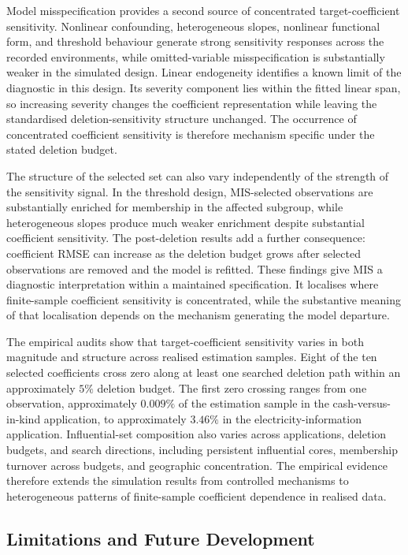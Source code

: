 \documentclass[../main.tex]{subfiles}
\begin{document}
Model misspecification provides a second source of concentrated target-coefficient sensitivity. Nonlinear confounding, heterogeneous slopes, nonlinear functional form, and threshold behaviour generate strong sensitivity responses across the recorded environments, while omitted-variable misspecification is substantially weaker in the simulated design. Linear endogeneity identifies a known limit of the diagnostic in this design. Its severity component lies within the fitted linear span, so increasing severity changes the coefficient representation while leaving the standardised deletion-sensitivity structure unchanged. The occurrence of concentrated coefficient sensitivity is therefore mechanism specific under the stated deletion budget.

The structure of the selected set can also vary independently of the strength of the sensitivity signal. In the threshold design, MIS-selected observations are substantially enriched for membership in the affected subgroup, while heterogeneous slopes produce much weaker enrichment despite substantial coefficient sensitivity. The post-deletion results add a further consequence: coefficient RMSE can increase as the deletion budget grows after selected observations are removed and the model is refitted. These findings give MIS a diagnostic interpretation within a maintained specification. It localises where finite-sample coefficient sensitivity is concentrated, while the substantive meaning of that localisation depends on the mechanism generating the model departure.

The empirical audits show that target-coefficient sensitivity varies in both magnitude and structure across realised estimation samples. Eight of the ten selected coefficients cross zero along at least one searched deletion path within an approximately \(5\%\) deletion budget. The first zero crossing ranges from one observation, approximately \(0.009\%\) of the estimation sample in the cash-versus-in-kind application, to approximately \(3.46\%\) in the electricity-information application. Influential-set composition also varies across applications, deletion budgets, and search directions, including persistent influential cores, membership turnover across budgets, and geographic concentration. The empirical evidence therefore extends the simulation results from controlled mechanisms to heterogeneous patterns of finite-sample coefficient dependence in realised data.

\subsection{Limitations and Future Development}
\end{document}
